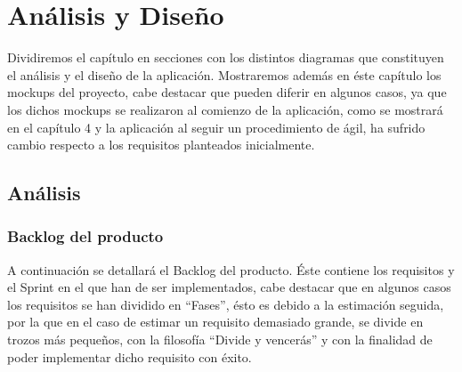 \documentclass[11pt,openany]{book}
\begin{document}
\chapter{Análisis y Diseño}

Dividiremos el capítulo en secciones con los distintos diagramas que constituyen el análisis y el diseño de la aplicación. Mostraremos además en éste capítulo los mockups del proyecto, cabe destacar que pueden diferir en algunos casos, ya que los dichos mockups se realizaron al comienzo de la aplicación, como se mostrará en el capítulo 4 y la aplicación al seguir un procedimiento de ágil, ha sufrido cambio respecto a los requisitos planteados inicialmente.
\pagebreak

\section{Análisis}

\subsection{Backlog del producto}

A continuación se detallará el Backlog del producto. Éste contiene los requisitos y el Sprint en el que han de ser implementados, cabe destacar que en algunos casos los requisitos se han dividido en ``Fases'', ésto es debido a la estimación seguida, por la que en el caso de estimar un requisito demasiado grande, se divide en trozos más pequeños, con la filosofía ``Divide y vencerás'' y con la finalidad de poder implementar dicho requisito con éxito. 
\end{document}
